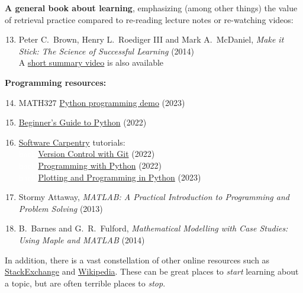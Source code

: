 \noindent\textbf{A general book about learning}, emphasizing (among other things) the value of retrieval practice compared to re-reading lecture notes or re-watching videos: \\[-24 pt]
\begin{enumerate}
  \setcounter{enumi}{12}
  \item Peter C.~Brown, Henry L.~Roediger III and Mark A.~McDaniel, \textit{Make it Stick: The Science of Successful Learning} (2014) \\
        A \href{https://www.youtube.com/watch?v=MfylloWuuZU}{short summary video} is also available
\end{enumerate}

\noindent\textbf{Programming resources:} \\[-24 pt]
\begin{enumerate}
  \setcounter{enumi}{13}
  \item MATH327 \href{https://tinyurl.com/math327demo}{Python programming demo} (2023)
  \item \href{https://wiki.python.org/moin/BeginnersGuide}{Beginner's Guide to Python} (2022)
  \item \href{https://software-carpentry.org}{Software Carpentry} tutorials: \\
        \textcolor{white}{hack} \href{https://swcarpentry.github.io/git-novice/}{Version Control with Git} (2022) \\
        \textcolor{white}{hack} \href{https://swcarpentry.github.io/python-novice-inflammation/}{Programming with Python} (2022) \\
        \textcolor{white}{hack} \href{https://swcarpentry.github.io/python-novice-gapminder/}{Plotting and Programming in Python} (2023)
  \item Stormy Attaway, \textit{MATLAB: A Practical Introduction to Programming and Problem Solving} (2013)
  \item B.~Barnes and G.~R.~Fulford, \textit{Mathematical Modelling with Case Studies: Using Maple and MATLAB} (2014)
\end{enumerate}

In addition, there is a vast constellation of other online resources such as \href{https://physics.stackexchange.com/questions/tagged/statistical-mechanics}{StackExchange} and \href{https://en.wikipedia.org/wiki/Statistical_physics}{Wikipedia}.
These can be great places to \emph{start} learning about a topic, but are often terrible places to \emph{stop}.
